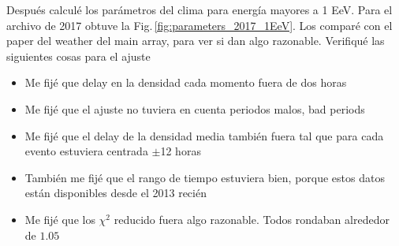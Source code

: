 			Después calculé los parámetros del clima para energía mayores a 1 EeV. Para el archivo de 2017 obtuve la Fig.\,\ref{fig:parameters_2017_1EeV}. Los comparé con el paper del weather del main array, para ver si dan algo razonable. Verifiqué las siguientes cosas para el ajuste

			\begin{itemize}
				\item Me fijé que delay en la densidad cada momento fuera de dos  horas
				\item Me fijé que el ajuste no tuviera en cuenta periodos malos, bad periods
				\item Me fijé que el delay de la densidad media también fuera tal que para cada evento estuviera centrada $\pm$12 horas
				\item También me fijé que el rango de tiempo estuviera bien, porque estos datos están disponibles desde el 2013  recién
				\item Me fijé que los $\chi^2$ reducido fuera algo razonable. Todos rondaban alrededor de $1.05$
			\end{itemize}


